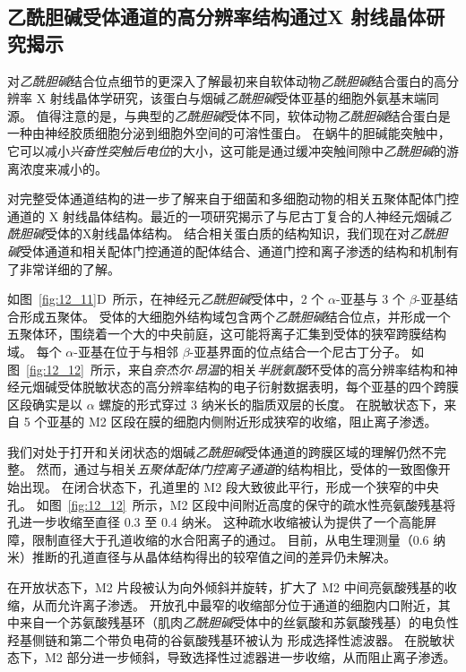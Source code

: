 \subsection{乙酰胆碱受体通道的高分辨率结构通过X 射线晶体研究揭示}

对\textit{乙酰胆碱}结合位点细节的更深入了解最初来自软体动物\textit{乙酰胆碱}结合蛋白的高分辨率 X 射线晶体学研究，该蛋白与烟碱\textit{乙酰胆碱}受体亚基的细胞外氨基末端同源。
值得注意的是，与典型的\textit{乙酰胆碱}受体不同，软体动物\textit{乙酰胆碱}结合蛋白是一种由神经胶质细胞分泌到细胞外空间的可溶性蛋白。
在蜗牛的胆碱能突触中，它可以减小\textit{兴奋性突触后电位}的大小，这可能是通过缓冲突触间隙中\textit{乙酰胆碱}的游离浓度来减小的。


对完整受体通道结构的进一步了解来自于细菌和多细胞动物的相关五聚体配体门控通道的 X 射线晶体结构。最近的一项研究揭示了与尼古丁复合的人神经元烟碱\textit{乙酰胆碱}受体的X射线晶体结构。
结合相关蛋白质的结构知识，我们现在对\textit{乙酰胆碱}受体通道和相关配体门控通道的配体结合、通道门控和离子渗透的结构和机制有了非常详细的了解。


如图~\ref{fig:12_11}D~所示，在神经元\textit{乙酰胆碱}受体中，2 个 $\alpha$-亚基与 3 个 $\beta$-亚基结合形成五聚体。
受体的大细胞外结构域包含两个\textit{乙酰胆碱}结合位点，并形成一个五聚体环，围绕着一个大的中央前庭，这可能将离子汇集到受体的狭窄跨膜结构域。
每个 $\alpha$-亚基在位于与相邻 $\beta$-亚基界面的位点结合一个尼古丁分子。
如图~\ref{fig:12_12}~所示，来自\textit{奈杰尔$\cdot$昂温}的相关\textit{半胱氨酸}环受体的高分辨率结构和神经元烟碱受体脱敏状态的高分辨率结构的电子衍射数据表明，每个亚基的四个跨膜区段确实是以 $\alpha$ 螺旋的形式穿过 3 纳米长的脂质双层的长度。
在脱敏状态下，来自 5 个亚基的 M2 区段在膜的细胞内侧附近形成狭窄的收缩，阻止离子渗透。


我们对处于打开和关闭状态的烟碱\textit{乙酰胆碱}受体通道的跨膜区域的理解仍然不完整。
然而，通过与相关\textit{五聚体配体门控离子通道}的结构相比，受体的一致图像开始出现。
在闭合状态下，孔道里的 M2 段大致彼此平行，形成一个狭窄的中央孔。
如图~\ref{fig:12_12}~所示，M2 区段中间附近高度的保守的疏水性亮氨酸残基将孔进一步收缩至直径 0.3 至 0.4 纳米。
这种疏水收缩被认为提供了一个高能屏障，限制直径大于孔道收缩的水合阳离子的通过。
目前，从电生理测量（0.6 纳米）推断的孔道直径与从晶体结构得出的较窄值之间的差异仍未解决。


在开放状态下，M2 片段被认为向外倾斜并旋转，扩大了 M2 中间亮氨酸残基的收缩，从而允许离子渗透。
开放孔中最窄的收缩部分位于通道的细胞内口附近，其中来自一个苏氨酸残基环（肌肉\textit{乙酰胆碱}受体中的丝氨酸和苏氨酸残基）的电负性羟基侧链和第二个带负电荷的谷氨酸残基环被认为 形成选择性滤波器。
在脱敏状态下，M2 部分进一步倾斜，导致选择性过滤器进一步收缩，从而阻止离子渗透。


